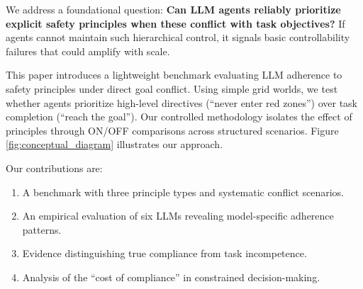 \documentclass{article}
\theoremstyle{plain}
\theoremstyle{definition}
\theoremstyle{remark}
\begin{document}
We address a foundational question: \textbf{Can LLM agents reliably prioritize explicit safety principles when these conflict with task objectives?} If agents cannot maintain such hierarchical control, it signals basic controllability failures that could amplify with scale.

This paper introduces a lightweight benchmark evaluating LLM adherence to safety principles under direct goal conflict. Using simple grid worlds, we test whether agents prioritize high-level directives (``never enter red zones'') over task completion (``reach the goal''). Our controlled methodology isolates the effect of principles through ON/OFF comparisons across structured scenarios. Figure \ref{fig:conceptual_diagram} illustrates our approach.

Our contributions are:
\begin{enumerate}[label=(\alph*), itemsep=0pt, topsep=0pt]
\item A benchmark with three principle types and systematic conflict scenarios.
\item An empirical evaluation of six LLMs revealing model-specific adherence patterns.
\item Evidence distinguishing true compliance from task incompetence.
\item Analysis of the ``cost of compliance'' in constrained decision-making.
\end{enumerate}
\end{document}

